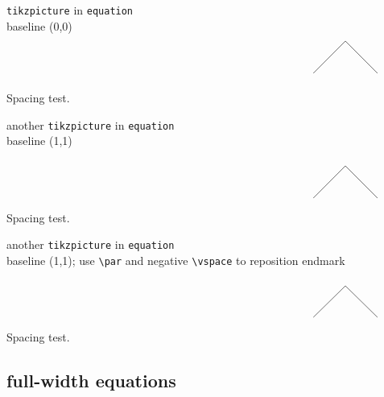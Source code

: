 \begin{test}
  \texttt{tikzpicture} in \texttt{equation}\\
  baseline (0,0)
  \begin{equation}
    \hspace*{.7\textwidth}
    \begin{tikzpicture}
      \draw (0,0) -- ++(1,1) -- ++(1,-1);
    \end{tikzpicture}
  \end{equation}
\end{test}
Spacing test.
\begin{test}
  another \texttt{tikzpicture} in \texttt{equation}\\
  baseline (1,1)
  \begin{equation}
    \hspace*{.7\textwidth}
    \begin{tikzpicture}[baseline={(1,1)}]
      \draw (0,0) -- ++(1,1) -- ++(1,-1);
    \end{tikzpicture}
  \end{equation}
\end{test}
Spacing test.
\begin{test}
  another \texttt{tikzpicture} in \texttt{equation}\\
  baseline (1,1); use \verb|\par| and negative \verb|\vspace| to reposition endmark
  \begin{equation}
    \hspace*{.7\textwidth}
    \begin{tikzpicture}[baseline={(1,1)}]
      \draw (0,0) -- ++(1,1) -- ++(1,-1);
    \end{tikzpicture}
  \end{equation}\qedprev[1.3]
\end{test}
Spacing test.

\subsection{full-width equations}

